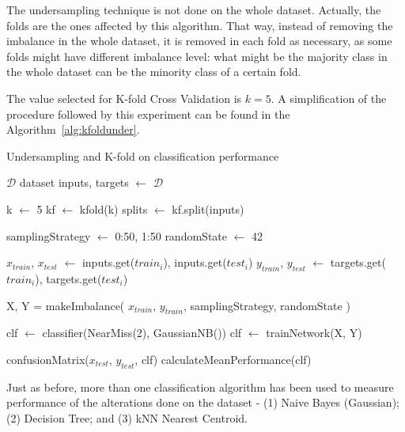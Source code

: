 The undersampling technique is not done on the whole dataset. Actually, the
folds are the ones affected by this algorithm. That way, instead of removing the
imbalance in the whole dataset, it is removed in each fold as necessary,
as some folds might have different imbalance level: what might be the majority 
class in the whole dataset can be the minority class of a certain fold.

The value selected for K-fold Cross Validation is $k=5$. A simplification
of the procedure followed by this experiment can be found in the Algorithm~\ref{alg:kfoldunder}.

\begin{breakablealgorithm}
    \caption{Undersampling and K-fold on classification performance}
    \label{alg:kfoldunder}
    \begin{algorithmic}[1]
        \Require $\mathcal{D}$ dataset
        \State inputs, targets $\leftarrow$ $\mathcal{D}$
    
        \State k $\leftarrow$ 5
        \State kf $\leftarrow$ kfold(k)
        \State splits $\leftarrow$ kf.split(inputs)
        
        \State samplingStrategy $\leftarrow$ {0:50, 1:50} 
        \State randomState $\leftarrow$ 42
        
        	\State $x_{train}$, $x_{test}$ $\leftarrow$ inputs.get($train_{i}$), inputs.get($test_{i}$)
        	\State $y_{train}$, $y_{test}$ $\leftarrow$ targets.get($train_{i}$), targets.get($test_{i}$)
        	
        	\State X, Y = makeImbalance(
        	\State \quad $x_{train}$, $y_{train}$,
        	\State \quad samplingStrategy,
        	\State \quad randomState
        	\State )
        	
        	\State clf $\leftarrow$ classifier(NearMiss(2), GaussianNB())
        	\State clf $\leftarrow$ trainNetwork(X, Y)
        	
        	\State confusionMatrix($x_{test}$, $y_{test}$, clf)
        \EndFor
        \State calculateMeanPerformance(clf)
    \end{algorithmic}
\end{breakablealgorithm}

Just as before, more than one classification algorithm has been used to measure
performance of the alterations done on the dataset - (1) Naive Bayes 
(Gaussian); (2) Decision Tree; and (3) kNN Nearest Centroid.

